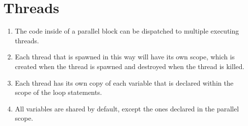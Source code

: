 \section{Threads}
\begin{enumerate}
	\item The code inside of a parallel block can be dispatched to multiple executing threads.
	\item Each thread that is spawned in this way will have its own scope, which is created when the thread is spawned and destroyed when the thread is killed.
	\item Each thread has its own copy of each variable that is declared within the scope of the loop statements.
	\item All variables are shared by default, except the ones declared in the parallel scope.
\end{enumerate}
